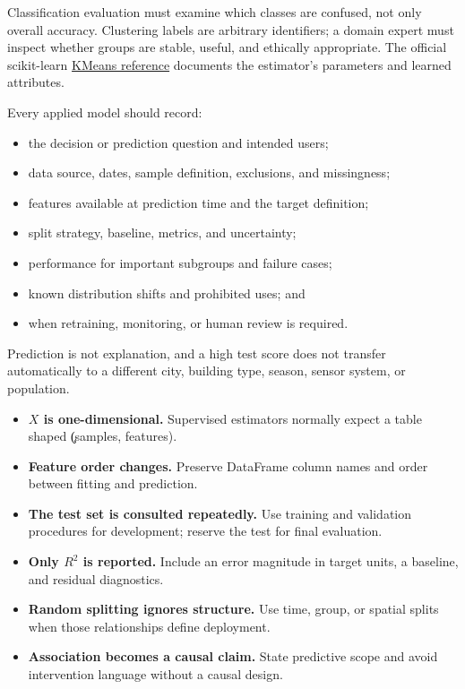 Classification evaluation must examine which classes are confused, not only
overall accuracy. Clustering labels are arbitrary identifiers; a domain expert
must inspect whether groups are stable, useful, and ethically appropriate. The
official scikit-learn
\href{https://scikit-learn.org/stable/modules/generated/sklearn.cluster.KMeans.html}{KMeans reference}
documents the estimator's parameters and learned attributes.


Every applied model should record:

\begin{itemize}
    \item the decision or prediction question and intended users;
    \item data source, dates, sample definition, exclusions, and missingness;
    \item features available at prediction time and the target definition;
    \item split strategy, baseline, metrics, and uncertainty;
    \item performance for important subgroups and failure cases;
    \item known distribution shifts and prohibited uses; and
    \item when retraining, monitoring, or human review is required.
\end{itemize}

Prediction is not explanation, and a high test score does not transfer
automatically to a different city, building type, season, sensor system, or
population.


\begin{itemize}
    \item \textbf{$X$ is one-dimensional.} Supervised estimators normally expect
          a table shaped \c{(samples, features)}.
    \item \textbf{Feature order changes.} Preserve DataFrame column names and
          order between fitting and prediction.
    \item \textbf{The test set is consulted repeatedly.} Use training and
          validation procedures for development; reserve the test for final evaluation.
    \item \textbf{Only $R^2$ is reported.} Include an error magnitude in target
          units, a baseline, and residual diagnostics.
    \item \textbf{Random splitting ignores structure.} Use time, group, or
          spatial splits when those relationships define deployment.
    \item \textbf{Association becomes a causal claim.} State predictive scope
          and avoid intervention language without a causal design.
\end{itemize}

